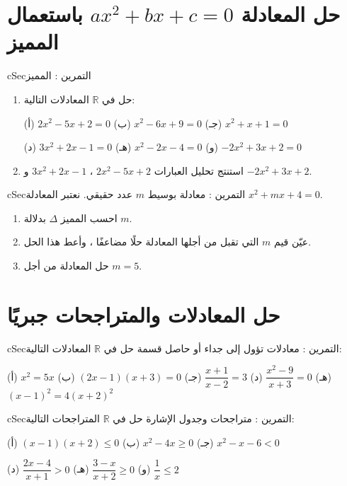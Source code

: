 \documentclass[12pt,a4paper]{article}
\newenvironment{BOX}[2]{\begin{otherlanguage}{english}\begin{arbox}{#1}{#2}}{\end{arbox}\end{otherlanguage}}
\newcounter{exo}
\newenvironment{tamrin}[1]{\stepcounter{exo}\begin{BOX}{cSec}{التمرين \theexo: #1}}{\end{BOX}}
\newcommand{\R}{\mathbb{R}}
\begin{document}
\section{حل المعادلة $ax^2+bx+c=0$ باستعمال المميز}
\begin{tamrin}{المميز}
\begin{enumerate}
\item حل في $\R$ المعادلات التالية:\par
(أ) $2x^2-5x+2=0$ \qquad (ب) $x^2-6x+9=0$ \qquad (جـ) $x^2+x+1=0$\par
(د) $3x^2+2x-1=0$ \qquad (هـ) $x^2-2x-4=0$ \qquad (و) $-2x^2+3x+2=0$
\item استنتج تحليل العبارات $2x^2-5x+2$ ، $3x^2+2x-1$ و $-2x^2+3x+2$.
\end{enumerate}
\end{tamrin}

\begin{tamrin}{معادلة بوسيط}
$m$ عدد حقيقي. نعتبر المعادلة $x^2+mx+4=0$.
\begin{enumerate}
\item احسب المميز $\Delta$ بدلالة $m$.
\item عيّن قيم $m$ التي تقبل من أجلها المعادلة حلًا مضاعفًا ، وأعط هذا الحل.
\item حل المعادلة من أجل $m=5$.
\end{enumerate}
\end{tamrin}

\section{حل المعادلات والمتراجحات جبريًا}
\begin{tamrin}{معادلات تؤول إلى جداء أو حاصل قسمة}
حل في $\R$ المعادلات التالية:\par
(أ) $x^2=5x$ \qquad (ب) $(2x-1)(x+3)=0$ \qquad (جـ) $\dfrac{x+1}{x-2}=3$ \qquad (د) $\dfrac{x^2-9}{x+3}=0$ \qquad (هـ) $(x-1)^2=4(x+2)^2$
\end{tamrin}

\begin{tamrin}{متراجحات وجدول الإشارة}
حل في $\R$ المتراجحات التالية:\par
(أ) $(x-1)(x+2)\leqslant0$ \qquad (ب) $x^2-4x\geqslant0$ \qquad (جـ) $x^2-x-6<0$\par
(د) $\dfrac{2x-4}{x+1}>0$ \qquad (هـ) $\dfrac{3-x}{x+2}\geqslant0$ \qquad (و) $\dfrac1x\leqslant2$
\end{tamrin}
\end{document}
